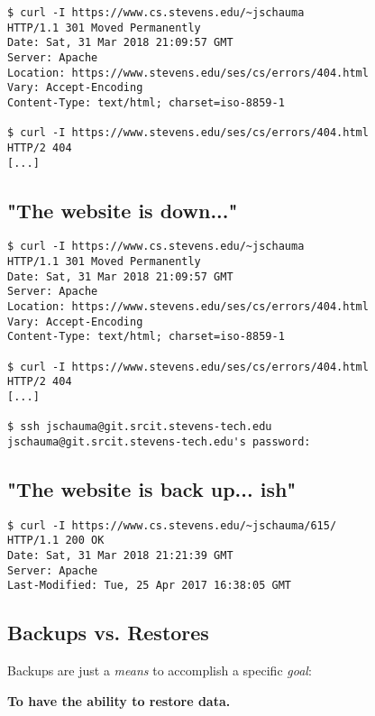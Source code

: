 \documentclass[xga]{xdvislides}
\begin{document}
\begin{verbatim}
$ curl -I https://www.cs.stevens.edu/~jschauma
HTTP/1.1 301 Moved Permanently
Date: Sat, 31 Mar 2018 21:09:57 GMT
Server: Apache
Location: https://www.stevens.edu/ses/cs/errors/404.html
Vary: Accept-Encoding
Content-Type: text/html; charset=iso-8859-1

$ curl -I https://www.stevens.edu/ses/cs/errors/404.html
HTTP/2 404
[...]
\end{verbatim}

\subsection{"The website is down..."}

\begin{verbatim}
$ curl -I https://www.cs.stevens.edu/~jschauma
HTTP/1.1 301 Moved Permanently
Date: Sat, 31 Mar 2018 21:09:57 GMT
Server: Apache
Location: https://www.stevens.edu/ses/cs/errors/404.html
Vary: Accept-Encoding
Content-Type: text/html; charset=iso-8859-1

$ curl -I https://www.stevens.edu/ses/cs/errors/404.html
HTTP/2 404
[...]

$ ssh jschauma@git.srcit.stevens-tech.edu
jschauma@git.srcit.stevens-tech.edu's password:
\end{verbatim}


\subsection{"The website is back up... ish"}

\begin{verbatim}
$ curl -I https://www.cs.stevens.edu/~jschauma/615/
HTTP/1.1 200 OK
Date: Sat, 31 Mar 2018 21:21:39 GMT
Server: Apache
Last-Modified: Tue, 25 Apr 2017 16:38:05 GMT
\end{verbatim}

\subsection{Backups vs. Restores}
\Huge
\begin{center}

Backups are just a {\em means} to accomplish a specific
{\em goal}: \\

\vspace{.5in}

{\bf To have the ability to restore data.}
\end{center}
\Normalsize
\end{document}
